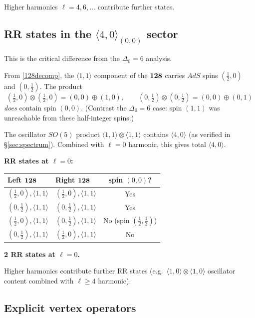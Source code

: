 \documentclass[12pt]{article}
\def\be{\begin{equation}}
\def\ee{\end{equation}}
\newcommand{\D}{\ensuremath{\Delta}}
\begin{document}
Higher harmonics $\ell=4,6,\ldots$ contribute further states.

\subsection{RR states in the \texorpdfstring{$\langle 4,0\rangle_{(0,0)}$}{<4,0>(0,0)} sector}

This is the critical difference from the $\D_0=6$ analysis.

From \eqref{128decomp}, the $\langle 1,1\rangle$ component of the ${\bf 128}$ carries
$AdS$ spins $(\tfrac12,0)$ and $(0,\tfrac12)$. The product
\be
(\tfrac12,0)\otimes(\tfrac12,0)=(0,0)\oplus(1,0),
\qquad
(0,\tfrac12)\otimes(0,\tfrac12)=(0,0)\oplus(0,1)
\ee
\emph{does} contain spin $(0,0)$. (Contrast the $\D_0=6$ case: spin $(1,1)$ was
unreachable from these half-integer spins.)

The oscillator $SO(5)$ product $\langle 1,1\rangle\otimes\langle 1,1\rangle$ contains
$\langle 4,0\rangle$ (as verified in \S\ref{sec:spectrum}). Combined with $\ell=0$ harmonic,
this gives total $\langle 4,0\rangle$.

\smallskip\noindent
\textbf{RR states at $\ell=0$:}
\begin{center}
\begin{tabular}{|l|l|c|}
\hline
Left ${\bf 128}$ & Right ${\bf 128}$ & spin $(0,0)$? \\
\hline
$(\tfrac12,0),\langle 1,1\rangle$ & $(\tfrac12,0),\langle 1,1\rangle$ & Yes \\
$(0,\tfrac12),\langle 1,1\rangle$ & $(0,\tfrac12),\langle 1,1\rangle$ & Yes \\
$(\tfrac12,0),\langle 1,1\rangle$ & $(0,\tfrac12),\langle 1,1\rangle$ & No (spin $(\tfrac12,\tfrac12)$)\\
$(0,\tfrac12),\langle 1,1\rangle$ & $(\tfrac12,0),\langle 1,1\rangle$ & No \\
\hline
\end{tabular}
\end{center}
\textbf{2 RR states at $\ell=0$.}

Higher harmonics contribute further RR states (e.g.\ $\langle 1,0\rangle\otimes\langle 1,0\rangle$
oscillator content combined with $\ell\geq 4$ harmonic).

\subsection{Explicit vertex operators}
\label{sec:explicit_vertices}
\end{document}
